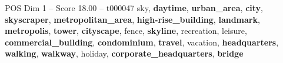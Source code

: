 \begin{textsample}{POS Dim 1 – Score 18.00 – t000047}  \label{ex:f1_pos_032}
sky, \textbf{daytime}, \textbf{urban\_area}, \textbf{city}, \textbf{skyscraper}, \textbf{metropolitan\_area}, \textbf{high-rise\_building}, \textbf{landmark}, \textbf{metropolis}, \textbf{tower}, \textbf{cityscape}, fence, \textbf{skyline}, recreation, leisure, \textbf{commercial\_building}, \textbf{condominium}, \textbf{travel}, vacation, \textbf{headquarters}, \textbf{walking}, \textbf{walkway}, holiday, \textbf{corporate\_headquarters}, \textbf{bridge}

\end{textsample}
